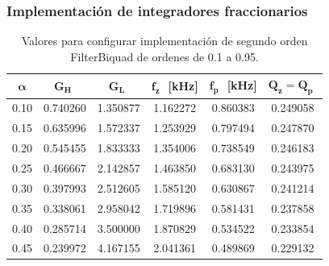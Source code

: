 \documentclass[10pt]{beamer}
\begin{document}
	\begin{frame}
		\frametitle{Implementación de integradores fraccionarios}
		\begin{minipage}[b]{0.45\textwidth}
			\begin{tiny}
			\begin{table}[!hbp]                                      
		\centering   
		\caption{Valores para configurar implementación de segundo orden FilterBiquad de ordenes de 0.1 a 0.95.}                            
		\label{tab:calculos_biquad}                                        
			\begin{tabular}{cccccc}                        
			\hline                                              
			$\bm{\alpha}$ & $\bm{G_{H}}\,\,$  & $\bm{G_{L}}\,\,$  & $\bm{f_{z}}\,\,$ [kHz] & $\bm{f_{p}}\,\,$ [kHz] & $\bm{Q_{z} = Q_{p}}\,\,$  \\            
			\hline                                              
			0.10 & 0.740260 & 1.350877 & 1.162272 & 0.860383 & 0.249058 \\   
		                                                          
			0.15 & 0.635996 & 1.572337 & 1.253929 & 0.797494 & 0.247870 \\   
		                                                        
			0.20 & 0.545455 & 1.833333 & 1.354006 & 0.738549 & 0.246183 \\   
	                                                          
			0.25 & 0.466667 & 2.142857 & 1.463850 & 0.683130 & 0.243975 \\   
		                                                        
			0.30 & 0.397993 & 2.512605 & 1.585120 & 0.630867 & 0.241214 \\   
		                                                          
			0.35 & 0.338061 & 2.958042 & 1.719896 & 0.581431 & 0.237858 \\   
			                                                        
			0.40 & 0.285714 & 3.500000 & 1.870829 & 0.534522 & 0.233854 \\   
		                                                          
			0.45 & 0.239972 & 4.167155 & 2.041361 & 0.489869 & 0.229132 \\   
			                                                          

\end{tabular}
\end{table}
\end{tiny}
\end{minipage}
\end{frame}
\end{document}
